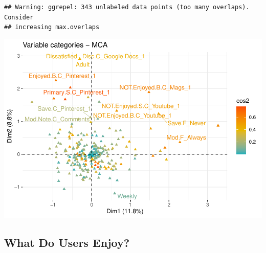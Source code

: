 \documentclass[
]{article}
\newenvironment{Shaded}{\begin{snugshade}}{\end{snugshade}}
\newcommand{\DataTypeTok}[1]{\textcolor[rgb]{0.13,0.29,0.53}{#1}}
\newcommand{\KeywordTok}[1]{\textcolor[rgb]{0.13,0.29,0.53}{\textbf{#1}}}
\newcommand{\NormalTok}[1]{#1}
\newcommand{\OtherTok}[1]{\textcolor[rgb]{0.56,0.35,0.01}{#1}}
\newcommand{\StringTok}[1]{\textcolor[rgb]{0.31,0.60,0.02}{#1}}
\begin{document}
\begin{Shaded}
\end{Shaded}

\begin{verbatim}
## Warning: ggrepel: 343 unlabeled data points (too many overlaps). Consider
## increasing max.overlaps
\end{verbatim}

\includegraphics{Average-User-MCA_files/figure-latex/mca all search data-3.pdf}

\hypertarget{what-do-users-enjoy}{%
\subsection{What Do Users Enjoy?}\label{what-do-users-enjoy}}
\end{document}
